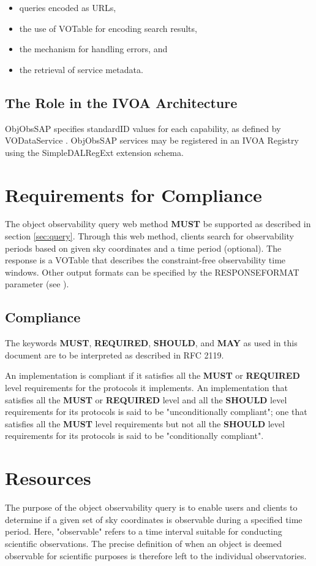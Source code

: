 \documentclass[11pt,a4paper]{ivoatex/ivoa}
\begin{document}
\begin{itemize}
\item queries encoded as URLs,
\item the use of VOTable for encoding search results,
\item the mechanism for handling errors, and
\item the retrieval of service metadata.
\end{itemize}


\subsection{The Role in the IVOA Architecture}
ObjObsSAP specifies standardID values \citep{2016ivoa.spec.0523D} for each
capability, as defined by VODataService \citep{2010ivoa.spec.1202P}. ObjObsSAP
services may be registered in an IVOA Registry using the SimpleDALRegExt
\citep{2017ivoa.spec.0530P} extension schema.


\section{Requirements for Compliance}
The object observability query web method \textbf{MUST} be supported as described
in section \ref{sec:query}. Through this web method, clients search for observability
periods based on given sky coordinates and a time period (optional). The
response is a VOTable that describes the constraint-free observability time
windows. Other output formats can be specified by the RESPONSEFORMAT
parameter (see \citet{2017ivoa.spec.0517D}).

\subsection{Compliance}
The keywords \textbf{MUST}, \textbf{REQUIRED}, \textbf{SHOULD},
and \textbf{MAY} as used in this document are to be interpreted as
described in RFC 2119.

An implementation is compliant if it satisfies all the \textbf{MUST}
or \textbf{REQUIRED} level requirements for the protocols it
implements. An implementation that satisfies all the \textbf{MUST} or
\textbf{REQUIRED} level and all the \textbf{SHOULD} level
requirements for its protocols is said to be "unconditionally
compliant"; one that satisfies all the \textbf{MUST} level
requirements but not all the \textbf{SHOULD} level requirements for
its protocols is said to be "conditionally compliant".

\section{Resources}
The purpose of the object observability query is to enable users and clients to
determine if a given set of sky coordinates is observable during a specified time period.
Here, "observable" refers to a time interval suitable for conducting scientific observations. 
The precise definition of when an object is deemed observable for scientific purposes is therefore left to the individual observatories.
\end{document}
